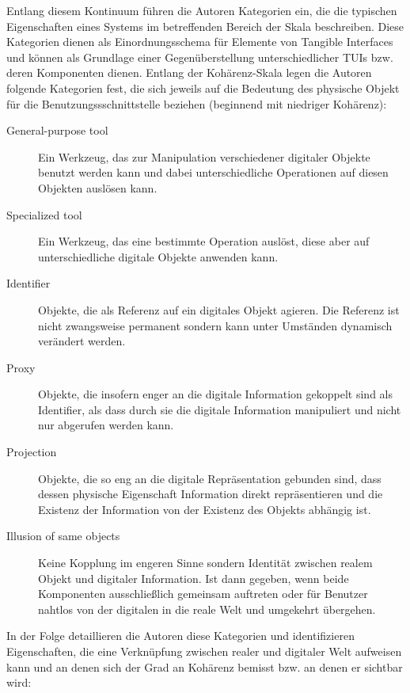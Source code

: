 Entlang diesem Kontinuum führen die Autoren Kategorien ein, die die typischen Eigenschaften eines Systems im betreffenden Bereich der Skala beschreiben. Diese Kategorien dienen als Einordnungsschema für Elemente von Tangible Interfaces und können als Grundlage einer Gegenüberstellung unterschiedlicher \glspl{TUI} bzw. deren Komponenten dienen. Entlang der Kohärenz-Skala legen die Autoren folgende Kategorien fest, die sich jeweils auf die Bedeutung des physische Objekt für die Benutzungssschnittstelle beziehen (beginnend mit niedriger Kohärenz): 

\begin{description}
	\item[General-purpose tool] Ein Werkzeug, das zur Manipulation verschiedener digitaler Objekte benutzt werden kann und dabei unterschiedliche Operationen auf diesen Objekten auslösen kann.
	\item[Specialized tool] Ein Werkzeug, das eine bestimmte Operation auslöst, diese aber auf unterschiedliche digitale Objekte anwenden kann.
	\item[Identifier] Objekte, die als Referenz auf ein digitales Objekt agieren. Die Referenz ist nicht zwangsweise permanent sondern kann unter Umständen dynamisch verändert werden.
	\item[Proxy] Objekte, die insofern enger an die digitale Information gekoppelt sind als Identifier, als dass durch sie die digitale Information manipuliert und nicht nur abgerufen werden kann. 
	\item[Projection] Objekte, die so eng an die digitale Repräsentation gebunden sind, dass dessen physische Eigenschaft Information direkt repräsentieren und die Existenz der Information von der Existenz des Objekts abhängig ist.
	\item[Illusion of same objects] Keine Kopplung im engeren Sinne sondern Identität zwischen realem Objekt und digitaler Information. Ist dann gegeben, wenn beide Komponenten ausschließlich gemeinsam auftreten oder für Benutzer nahtlos von der digitalen in die reale Welt und umgekehrt übergehen.
\end{description}

In der Folge detaillieren die Autoren diese Kategorien und identifizieren Eigenschaften, die eine Verknüpfung zwischen realer und digitaler Welt aufweisen kann und an denen sich der Grad an Kohärenz bemisst bzw. an denen er sichtbar wird:

